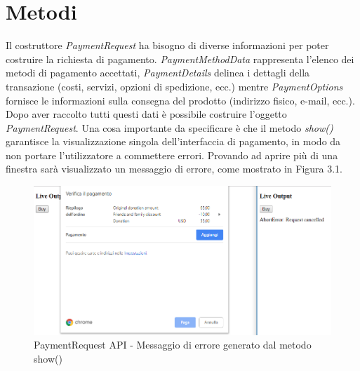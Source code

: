 \documentclass[12pt ,a4paper , twoside , openright ]{book}
\begin{document}
	\section{Metodi}
	Il costruttore \textit{PaymentRequest} ha bisogno di diverse informazioni per poter costruire la richiesta di pagamento. \textit{PaymentMethodData}\cite{rif11} rappresenta l'elenco dei metodi di pagamento accettati, \textit{PaymentDetails}\cite{rif14} delinea i dettagli della transazione (costi, servizi, opzioni di spedizione, ecc.) mentre \textit{PaymentOptions}\cite{rif16} fornisce le informazioni sulla consegna del prodotto (indirizzo fisico, e-mail, ecc.). Dopo aver raccolto tutti questi dati è possibile costruire l'oggetto \textit{PaymentRequest}. Una cosa importante da specificare è che il metodo \textit{show()}\cite{rif12} garantisce la visualizzazione singola dell'interfaccia di pagamento, in modo da non portare l'utilizzatore a commettere errori. Provando ad aprire più di una finestra sarà visualizzato un messaggio di errore, come mostrato in Figura 3.1.
	\begin{figure}[h]
		\centering
		\includegraphics[width=0.8\linewidth]{Buy}
		\caption{PaymentRequest API - Messaggio di errore generato dal metodo show() \cite{rif12}}
		\label{fig: PaymentRequest API - Messaggio di errore generato dal metodo show()}
	\end{figure} \\
\end{document}
